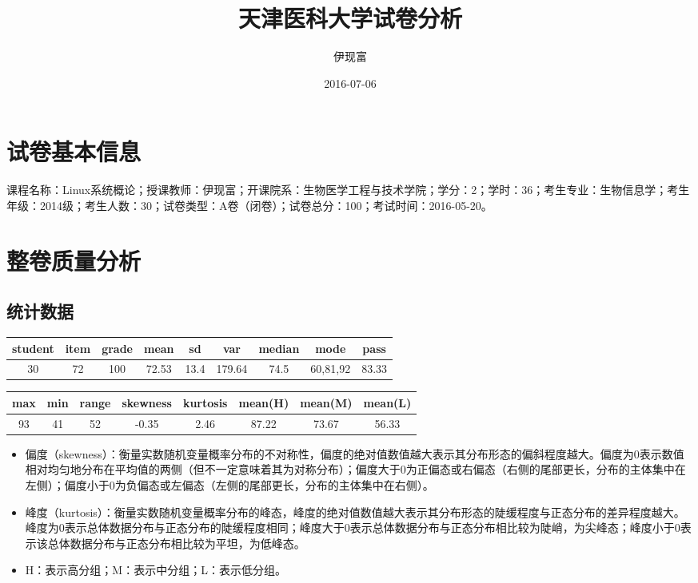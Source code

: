 \documentclass[hyperref,adobefonts]{ctexart}
\title{天津医科大学试卷分析}
\author{伊现富}
\date{2016-07-06}
\providecommand{\tightlist}{\setlength{\itemsep}{0pt}\setlength{\parskip}{0pt}}
\begin{document}
\maketitle

{
\setcounter{tocdepth}{2}
\tableofcontents
}
\section{试卷基本信息}

课程名称：Linux系统概论；授课教师：伊现富；开课院系：生物医学工程与技术学院；学分：2；学时：36；考生专业：生物信息学；考生年级：2014级；考生人数：30；试卷类型：A卷（闭卷）；试卷总分：100；考试时间：2016-05-20。

\section{整卷质量分析}

\subsection{统计数据}

\begin{longtable}{c|c|c|c|c|c|c|c|c}
\hline
student & item & grade & mean & sd & var & median & mode & pass\\
\hline
30 & 72 & 100 & 72.53 & 13.4 & 179.64 & 74.5 & 60,81,92 & 83.33\\
\hline
\end{longtable}

\begin{longtable}{c|c|c|c|c|c|c|c}
\hline
max & min & range & skewness & kurtosis & mean(H) & mean(M) & mean(L)\\
\hline
93 & 41 & 52 & -0.35 & 2.46 & 87.22 & 73.67 & 56.33\\
\hline
\end{longtable}

\begin{itemize}
\tightlist
\item
  偏度（skewness）：衡量实数随机变量概率分布的不对称性，偏度的绝对值数值越大表示其分布形态的偏斜程度越大。偏度为0表示数值相对均匀地分布在平均值的两侧（但不一定意味着其为对称分布）；偏度大于0为正偏态或右偏态（右侧的尾部更长，分布的主体集中在左侧）；偏度小于0为负偏态或左偏态（左侧的尾部更长，分布的主体集中在右侧）。
\item
  峰度（kurtosis）：衡量实数随机变量概率分布的峰态，峰度的绝对值数值越大表示其分布形态的陡缓程度与正态分布的差异程度越大。峰度为0表示总体数据分布与正态分布的陡缓程度相同；峰度大于0表示总体数据分布与正态分布相比较为陡峭，为尖峰态；峰度小于0表示该总体数据分布与正态分布相比较为平坦，为低峰态。
\item
  H：表示高分组；M：表示中分组；L：表示低分组。
\end{itemize}
\end{document}
